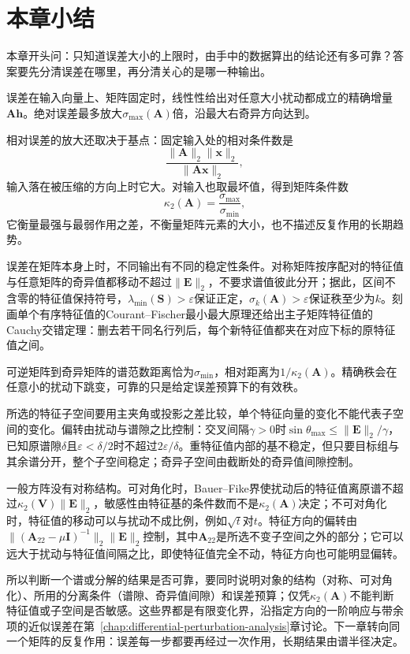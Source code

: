 \FloatBarrier
\section{本章小结}
\label{sec:condition-perturbation-summary}

本章开头问：只知道误差大小的上限时，由手中的数据算出的结论还有多可靠？答案要先分清误差在哪里，再分清关心的是哪一种输出。

误差在输入向量上、矩阵固定时，线性性给出对任意大小扰动都成立的精确增量$\bm A\bm h$。绝对误差最多放大$\sigma_{\max}(\bm A)$倍，沿最大右奇异方向达到。

相对误差的放大还取决于基点：固定输入处的相对条件数是
\[
 \frac{\lVert\bm A\rVert_2\lVert\bm x\rVert_2}{\lVert\bm A\bm x\rVert_2},
\]
输入落在被压缩的方向上时它大。对输入也取最坏值，得到矩阵条件数
\[
 \kappa_2(\bm A)=\frac{\sigma_{\max}}{\sigma_{\min}},
\]
它衡量最强与最弱作用之差，不衡量矩阵元素的大小，也不描述反复作用的长期趋势。

误差在矩阵本身上时，不同输出有不同的稳定性条件。对称矩阵按序配对的特征值与任意矩阵的奇异值都移动不超过$\lVert\bm E\rVert_2$，不要求谱值彼此分开；据此，区间不含零的特征值保持符号，$\lambda_{\min}(\bm S)>\varepsilon$保证正定，$\sigma_k(\bm A)>\varepsilon$保证秩至少为$k$。刻画单个有序特征值的Courant--Fischer最小最大原理还给出主子矩阵特征值的Cauchy交错定理：删去若干同名行列后，每个新特征值都夹在对应下标的原特征值之间。

可逆矩阵到奇异矩阵的谱范数距离恰为$\sigma_{\min}$，相对距离为$1/\kappa_2(\bm A)$。精确秩会在任意小的扰动下跳变，可靠的只是给定误差预算下的有效秩。

所选的特征子空间要用主夹角或投影之差比较，单个特征向量的变化不能代表子空间的变化。偏转由扰动与谱隙之比控制：交叉间隔$\gamma>0$时$\sin\theta_{\max}\leq\lVert\bm E\rVert_2/\gamma$，已知原谱隙$\delta$且$\varepsilon<\delta/2$时不超过$2\varepsilon/\delta$。重特征值内部的基不稳定，但只要目标组与其余谱分开，整个子空间稳定；奇异子空间由截断处的奇异值间隙控制。

一般方阵没有对称结构。可对角化时，Bauer--Fike界使扰动后的特征值离原谱不超过$\kappa_2(\bm V)\lVert\bm E\rVert_2$，敏感性由特征基的条件数而不是$\kappa_2(\bm A)$决定；不可对角化时，特征值的移动可以与扰动不成比例，例如$\sqrt t$对$t$。特征方向的偏转由$\lVert(\bm A_{22}-\mu\bm I)^{-1}\rVert_2\lVert\bm E\rVert_2$控制，其中$\bm A_{22}$是所选不变子空间之外的部分；它可以远大于扰动与特征值间隔之比，即使特征值完全不动，特征方向也可能明显偏转。

所以判断一个谱或分解的结果是否可靠，要同时说明对象的结构（对称、可对角化）、所用的分离条件（谱隙、奇异值间隙）和误差预算；仅凭$\kappa_2(\bm A)$不能判断特征值或子空间是否敏感。这些界都是有限变化界，沿指定方向的一阶响应与带余项的近似误差在第~\ref{chap:differential-perturbation-analysis}章讨论。下一章转向同一个矩阵的反复作用：误差每一步都要再经过一次作用，长期结果由谱半径决定。
